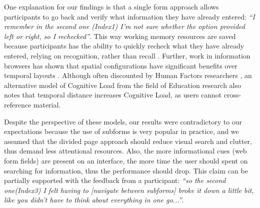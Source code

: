 \documentclass[../main/Replicate.tex]{subfiles}
\begin{document}
	One explanation for our findings is that a single form approach allows participants to go back and verify what information they have already entered: \textit{``I remember in the second one (Index1) I'm not sure whether the option provided left or right, so I rechecked''}. 
	This way working memory resources are saved because participants has the ability to quickly recheck what they have already entered, relying on recognition, rather than recall \cite{nielsen1990heuristic}. Further, work in information browsers has shown that spatial configurations have significant benefits over temporal layouts \cite{eps258800}. Although often discounted by Human Factors researchers \cite{wilson2015evaluation}, an alternative model of Cognitive Load from the field of Education research \cite{sweller1988cognitive} also notes that temporal distance increases Cognitive Load, as users cannot cross-reference material.
	
	Despite the perspective of these models, our results were contradictory to our expectations because the use of subforms is very popular in practice, and we assumed that the divided page approach should reduce visual search and clutter, thus demand less attentional resources. 
	Also, the more informational cues (web form fields) are present on an interface, the more time the user should spent on searching for information, thus the performance should drop. 
	This claim can be partially supported with the feedback from a participant: \textit{``so the second one(Index3) I felt having to [navigate between subforms] broke it down a little bit, like you didn't have to think about everything in one go...''}. 
\end{document}
